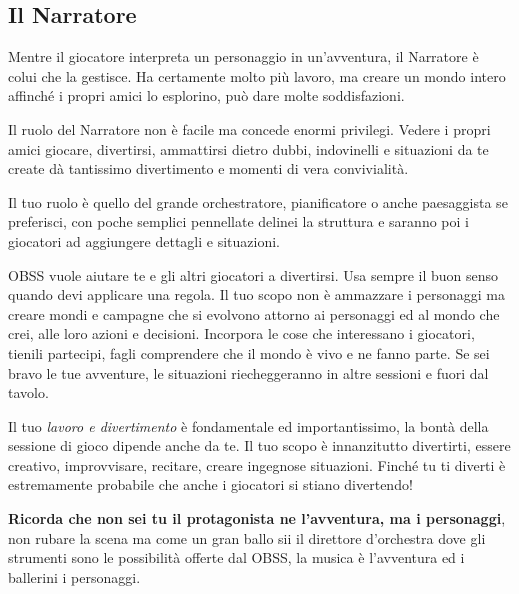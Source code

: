 \begin{multicols}{2}

\subsection{Il Narratore}

\label{il-narratore}

Mentre il giocatore interpreta un personaggio in un'avventura, il Narratore è colui che la gestisce. Ha certamente molto più lavoro, ma creare un mondo intero affinché i propri amici lo esplorino, può dare molte soddisfazioni.

Il ruolo del Narratore non è facile ma concede enormi privilegi. Vedere i propri amici giocare, divertirsi, ammattirsi dietro dubbi, indovinelli e situazioni da te create dà tantissimo divertimento e momenti di vera convivialità.

Il tuo ruolo è quello del grande orchestratore, pianificatore o anche paesaggista se preferisci, con poche semplici pennellate delinei la struttura e saranno poi i giocatori ad aggiungere dettagli e situazioni.

\begin{changemargin}{0.3cm}{0.3cm}\begin{narratore}
OBSS vuole aiutare te e gli altri giocatori a divertirsi. Usa sempre il buon senso quando devi applicare una regola. Il tuo scopo non è ammazzare i personaggi ma creare mondi e campagne che si evolvono attorno ai personaggi ed al mondo che crei, alle loro azioni e decisioni. Incorpora le cose che interessano i giocatori, tienili partecipi, fagli comprendere che il mondo è vivo e ne fanno parte. Se sei bravo le tue avventure, le situazioni riecheggeranno in altre sessioni e fuori dal tavolo.
\end{narratore}\end{changemargin}

Il tuo \emph{lavoro e divertimento} è fondamentale ed importantissimo, la bontà della sessione di gioco dipende anche da te. Il tuo scopo è innanzitutto divertirti, essere creativo, improvvisare, recitare, creare ingegnose situazioni. Finché tu ti diverti è estremamente probabile che anche i giocatori si stiano divertendo!

\textbf{Ricorda che non sei tu il protagonista ne l'avventura, ma i personaggi}, non rubare la scena ma come un gran ballo sii il direttore d'orchestra dove gli strumenti sono le possibilità offerte dal OBSS, la musica è l'avventura ed i ballerini i personaggi.


\end{multicols}
